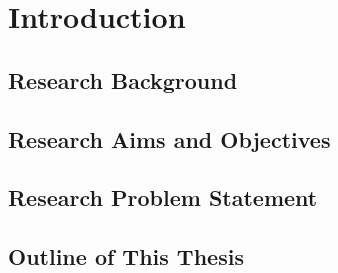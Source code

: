 \section{Introduction}\label{Sec: Introduction}

\lipsum[1]

\subsection{Research Background}\label{Sec: Research Background}

\lipsum[2]

\subsection{Research Aims and Objectives}\label{Sec: Research Aims and Objectives}

\lipsum[3]

\subsection{Research Problem Statement}\label{Sec: Research Problem Statement}

\lipsum[4]

\subsection{Outline of This Thesis}\label{Sec: Outline of This Thesis}

\lipsum[5]